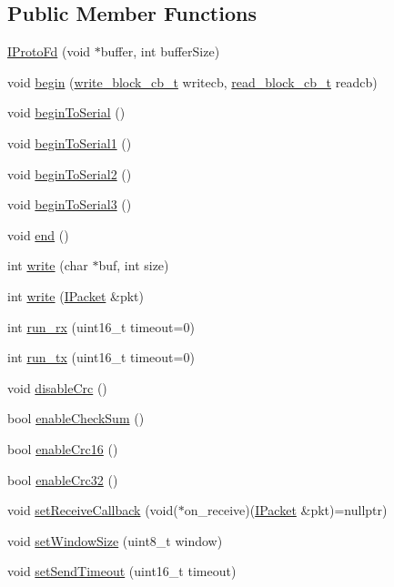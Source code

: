 \subsection*{Public Member Functions}
\begin{DoxyCompactItemize}
\item 
\hyperlink{classTiny_1_1IProtoFd_a65976c6faaf41504b7c15036edc054cf}{I\+Proto\+Fd} (void $\ast$buffer, int buffer\+Size)
\item 
void \hyperlink{classTiny_1_1IProtoFd_aae4e613316866105c130d613ecb25dd4}{begin} (\hyperlink{tiny__types_8h_aafd634660bba76cace57a8f9b01e044d}{write\+\_\+block\+\_\+cb\+\_\+t} writecb, \hyperlink{tiny__types_8h_a15bec127d9ee63658563d62e92b5261b}{read\+\_\+block\+\_\+cb\+\_\+t} readcb)
\item 
void \hyperlink{classTiny_1_1IProtoFd_a1cf42b4182e49dcde4862a768d07c811}{begin\+To\+Serial} ()
\item 
void \hyperlink{classTiny_1_1IProtoFd_a7d41a0caae1d5e6808a441c821ed8927}{begin\+To\+Serial1} ()
\item 
void \hyperlink{classTiny_1_1IProtoFd_ae7582aca0fa5472da6f4ae2911d56259}{begin\+To\+Serial2} ()
\item 
void \hyperlink{classTiny_1_1IProtoFd_a2d4df949358d4e8afa391e8960729d71}{begin\+To\+Serial3} ()
\item 
void \hyperlink{classTiny_1_1IProtoFd_ad17e76d0ef7ea40838e51acc2498c482}{end} ()
\item 
int \hyperlink{classTiny_1_1IProtoFd_adea59df6702e16fd986a91c7ee62012a}{write} (char $\ast$buf, int size)
\item 
int \hyperlink{classTiny_1_1IProtoFd_aa822a1dec320e6edc70a84699371fe81}{write} (\hyperlink{classTiny_1_1IPacket}{I\+Packet} \&pkt)
\item 
int \hyperlink{classTiny_1_1IProtoFd_a37292eb5c9faf1be8c4850985e0ae2eb}{run\+\_\+rx} (uint16\+\_\+t timeout=0)
\item 
int \hyperlink{classTiny_1_1IProtoFd_a19be0bd5124009c7de051554841070b3}{run\+\_\+tx} (uint16\+\_\+t timeout=0)
\item 
void \hyperlink{classTiny_1_1IProtoFd_af41446f47a7c520ff8f9683e6ae45614}{disable\+Crc} ()
\item 
bool \hyperlink{classTiny_1_1IProtoFd_a0f43402e86ea64f5c0154477d84b0c7c}{enable\+Check\+Sum} ()
\item 
bool \hyperlink{classTiny_1_1IProtoFd_a8b57afdb66434aa35409af34b04e1db9}{enable\+Crc16} ()
\item 
bool \hyperlink{classTiny_1_1IProtoFd_a1bf1f5211ae3a49caf73ee3de3bb9247}{enable\+Crc32} ()
\item 
void \hyperlink{classTiny_1_1IProtoFd_a70aa7c85b5fe83513eebb63b803d5825}{set\+Receive\+Callback} (void($\ast$on\+\_\+receive)(\hyperlink{classTiny_1_1IPacket}{I\+Packet} \&pkt)=nullptr)
\item 
void \hyperlink{classTiny_1_1IProtoFd_adddcc24bf1ef40d39c944679a97c1ec4}{set\+Window\+Size} (uint8\+\_\+t window)
\item 
void \hyperlink{classTiny_1_1IProtoFd_a2492655abda41d5b0fbda6f0e1c6badc}{set\+Send\+Timeout} (uint16\+\_\+t timeout)
\end{DoxyCompactItemize}
